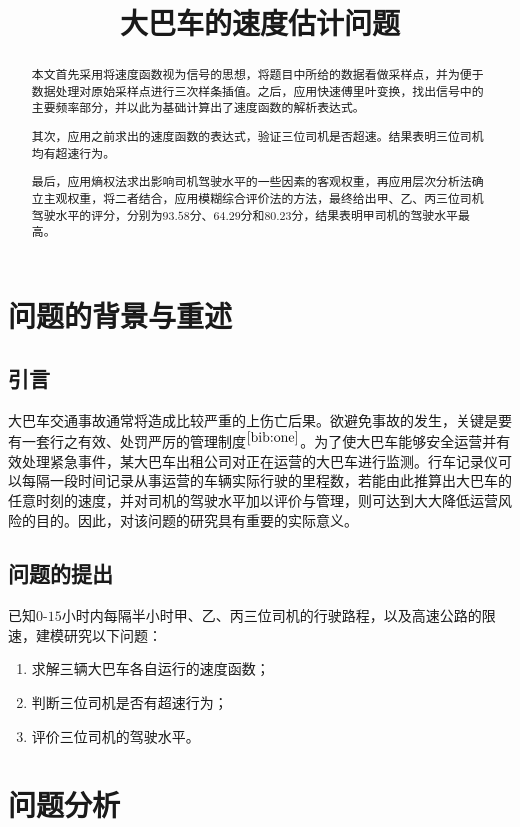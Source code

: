 \documentclass[bwprint]{cumcmthesis}
\title{大巴车的速度估计问题}
\begin{document}
    \maketitle
    \begin{abstract}
    本文首先采用将速度函数视为信号的思想，将题目中所给的数据看做采样点，并为便于数据处理对原始采样点进行三次样条插值。之后，应用快速傅里叶变换，找出信号中的主要频率部分，并以此为基础计算出了速度函数的解析表达式。

    其次，应用之前求出的速度函数的表达式，验证三位司机是否超速。结果表明三位司机均有超速行为。

    最后，应用熵权法求出影响司机驾驶水平的一些因素的客观权重，再应用层次分析法确立主观权重，将二者结合，应用模糊综合评价法的方法，最终给出甲、乙、丙三位司机驾驶水平的评分，分别为$93.58$分、$64.29$分和$80.23$分，结果表明甲司机的驾驶水平最高。
    \end{abstract}
    \section{问题的背景与重述}
        \subsection{引言}
        大巴车交通事故通常将造成比较严重的上伤亡后果。欲避免事故的发生，关键是要有一套行之有效、处罚严厉的管理制度$^{\cite{bib:one}}$。为了使大巴车能够安全运营并有效处理紧急事件，某大巴车出租公司对正在运营的大巴车进行监测。行车记录仪可以每隔一段时间记录从事运营的车辆实际行驶的里程数，若能由此推算出大巴车的任意时刻的速度，并对司机的驾驶水平加以评价与管理，则可达到大大降低运营风险的目的。因此，对该问题的研究具有重要的实际意义。
        \subsection{问题的提出}
        已知$0$-$15$小时内每隔半小时甲、乙、丙三位司机的行驶路程，以及高速公路的限速，建模研究以下问题：
        \begin{enumerate}
            \item 求解三辆大巴车各自运行的速度函数；
            \item 判断三位司机是否有超速行为；
            \item 评价三位司机的驾驶水平。
        \end{enumerate}
    \section{问题分析}
\end{document}

